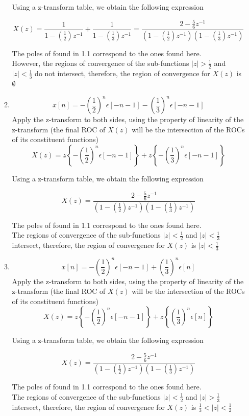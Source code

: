 \documentclass{article}
\begin{document}
\begin{enumerate}
\begin{enumerate}
Using a z-transform table, we obtain the following expression

$$
X(z)= \frac{1}{1- \left( \frac{1}{2}\right) z^{-1}} + \frac{1}{1- \left( \frac{1}{3}\right) z^{-1}} = \frac{2 -\frac{5}{6}z^{-1}}{\left(1 -\left(\frac{1}{2}\right) z^{-1}\right) \left(1 -\left(\frac{1}{3}\right) z^{-1} \right)}
$$

The poles of found in 1.1 correspond to the ones found here. \\
However, the regions of convergence of the sub-functions $|z|> \frac{1}{2}$ and $|z| < \frac{1}{3}$ do not intersect, therefore, the region of convergence for $X(z)$ is $\emptyset$


\item
$$
x[n] =-\left( \frac{1}{2}\right)^n\epsilon[-n-1] - \left( \frac{1}{3}\right)^n\epsilon[-n-1]
$$
        Apply the z-transform to both sides, using the property of linearity of the z-transform (the final ROC of $X(z)$ will be the intersection of the ROCs of its constituent functions)
$$
   X(z) = z\left\{ -\left(\frac{1}{2}\right)^n \epsilon[-n-1] \right\} + z\left\{-\left(\frac{1}{3}\right)^n  \epsilon[-n-1] \right\}
$$

Using a z-transform table, we obtain the following expression

$$
X(z) = \frac{2 -\frac{5}{6}z^{-1}}{\left(1 -\left(\frac{1}{2}\right) z^{-1}\right) \left(1 -\left(\frac{1}{3}\right) z^{-1} \right)}
$$

The poles of found in 1.1 correspond to the ones found here. \\
The regions of convergence of the sub-functions $|z| < \frac{1}{2}$ and $|z| < \frac{1}{3}$ intersect, therefore, the region of convergence for $X(z)$ is $|z| < \frac{1}{3}$


\item

$$
x[n] =-\left( \frac{1}{2}\right)^n\epsilon[-n-1] + \left( \frac{1}{3}\right)^n\epsilon[n]
$$
        Apply the z-transform to both sides, using the property of linearity of the z-transform (the final ROC of $X(z)$ will be the intersection of the ROCs of its constituent functions)
$$
   X(z) = z\left\{ -\left(\frac{1}{2}\right)^n \epsilon[-n-1] \right\} + z\left\{ \left(\frac{1}{3}\right)^n  \epsilon[n] \right\}
$$

Using a z-transform table, we obtain the following expression

$$
X(z) = \frac{2 -\frac{5}{6}z^{-1}}{\left(1 -\left(\frac{1}{2}\right) z^{-1}\right) \left(1 -\left(\frac{1}{3}\right) z^{-1} \right)}
$$

The poles of found in 1.1 correspond to the ones found here. \\
The regions of convergence of the sub-functions $|z| < \frac{1}{2}$ and $|z| > \frac{1}{3}$ intersect, therefore, the region of convergence for $X(z)$ is $\frac{1}{3} < |z| < \frac{1}{2}$
\end{enumerate}
\end{enumerate}
\end{document}
